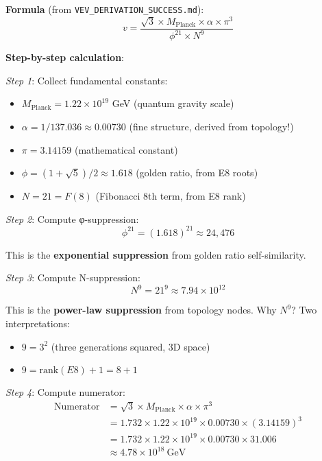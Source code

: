 \documentclass[12pt,a4paper]{article}
\begin{document}
\textbf{Formula} (from \texttt{VEV\_DERIVATION\_SUCCESS.md}):
\begin{equation}
v = \frac{\sqrt{3} \times M_{\text{Planck}} \times \alpha \times \pi^3}{\phi^{21} \times N^9}
\end{equation}

\textbf{Step-by-step calculation}:

\textit{Step 1}: Collect fundamental constants:
\begin{itemize}
\item $M_{\text{Planck}} = 1.22 \times 10^{19}$ GeV (quantum gravity scale)
\item $\alpha = 1/137.036 \approx 0.00730$ (fine structure, derived from topology!)
\item $\pi = 3.14159$ (mathematical constant)
\item $\phi = (1+\sqrt{5})/2 \approx 1.618$ (golden ratio, from E8 roots)
\item $N = 21 = F(8)$ (Fibonacci 8th term, from E8 rank)
\end{itemize}

\textit{Step 2}: Compute φ-suppression:
\begin{equation}
\phi^{21} = (1.618)^{21} \approx 24,476
\end{equation}

This is the \textbf{exponential suppression} from golden ratio self-similarity.

\textit{Step 3}: Compute N-suppression:
\begin{equation}
N^9 = 21^9 \approx 7.94 \times 10^{12}
\end{equation}

This is the \textbf{power-law suppression} from topology nodes. Why $N^9$? Two interpretations:
\begin{itemize}
\item $9 = 3^2$ (three generations squared, 3D space)
\item $9 = \text{rank}(E8) + 1 = 8 + 1$
\end{itemize}

\textit{Step 4}: Compute numerator:
\begin{align}
\text{Numerator} &= \sqrt{3} \times M_{\text{Planck}} \times \alpha \times \pi^3 \\
&= 1.732 \times 1.22 \times 10^{19} \times 0.00730 \times (3.14159)^3 \\
&= 1.732 \times 1.22 \times 10^{19} \times 0.00730 \times 31.006 \\
&\approx 4.78 \times 10^{18}\ \text{GeV}
\end{align}
\end{document}
